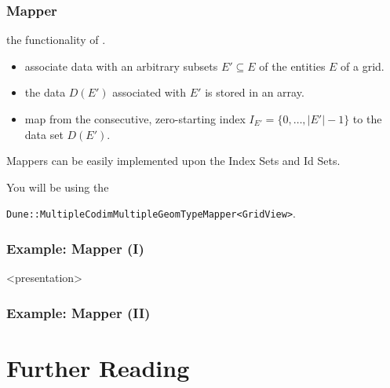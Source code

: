 \documentclass[aspectratio=169,11pt]{beamer}
\theoremstyle{definition}
\begin{document}
\begin{frame} \frametitle{Mapper}
   the functionality of .

  \medskip
  \begin{itemize}
  \item associate data with an arbitrary subsets $E'\subseteq E$
    of the entities $E$ of a grid.
  \item the data $D(E')$ associated with
    $E'$ is stored in an array.
  \item map from the consecutive, zero-starting index $I_{E'} =
    \{0, \ldots, |E'|-1\}$ to the data set $D(E')$.
  \end{itemize}

  \medskip
  Mappers can be easily implemented upon the Index Sets and Id Sets.

  \pause \medskip
  You will be using the

  \begin{codeblock}
  \centering
  \lstinline!Dune::MultipleCodimMultipleGeomTypeMapper<GridView>!.
  \end{codeblock}
\end{frame}

\begin{frame} \frametitle{Example: Mapper (I)}
\scriptsize
\begin{codeblock}
  
\end{codeblock}
\end{frame}

\begin{onlyenv}<presentation>
\begin{frame} \frametitle{Example: Mapper (II)}
\scriptsize
\begin{codeblock}
  
\end{codeblock}
\end{frame}
\end{onlyenv}

\section{Further Reading}
\end{document}
